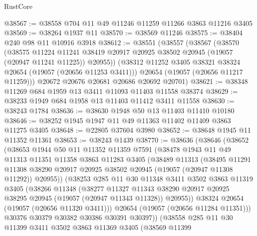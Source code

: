 \begin{lexlean}{RustCore}
\begin{coremodule}
@38567 := @38558 @704 @11 @49 @11246 @11259 @11266 @3863 @11216 @3405
@38569 := @38264 @1937 @11
@38570 := @38569 @11246
@38575 := @38404 @240 @98 @11 @10916 @3918
@38612 := @38551
    (@38557
      (@38567
        (@38570
          (@38575
            @11224
            @11241
            @38419
            @20917
            @20925
            @38502
            @20945
            (@19057 (@20947 @11241 @11225))
            @20955))
        (@38312 @11252 @3405 @38321 @38324 @20654 (@19057 (@20656 @11253 @3411)))
        @20654
        (@19057 (@20656 @11217 @11259)))
      @20672
      @20676
      @20681
      @20686
      @20692
      @20701)
@38621 := @38348 @11269 @684 @1959 @13 @3411 @11093 @11403 @11558 @38374
@38629 := @38233 @1949 @684 @1958 @13 @11403 @11412 @3411 @11558
@38630 := @38243 @1784
@38636 := @38630 @1948 @50 @13 @11403 @11410 @10180
@38646 := @38252 @1945 @1947 @11 @49 @11363 @11402 @11409 @3863 @11275 @3405
@38648 := @22805 @37604 @3980
@38652 := @38648 @1945 @11 @11352 @11361
@38653 := @38243 @1439
@38770 := @38636
    (@38646
      (@38652
        (@38653
          @1944
          @50
          @11
          @11352
          @11359
          @7591
          (@38478
            @1943
            @11
            @49
            @11313
            @11351
            @11358
            @3863
            @11283
            @3405
            (@38489
              @11313
              (@38495
                @11291
                @11308
                @38290
                @20917
                @20925
                @38502
                @20945
                (@19057 (@20947 @11308 @11292))
                @20955))
            (@38253
              @285
              @11
              @30
              @11348
              @3411
              @3502
              @3863
              @11319
              @3405
              (@38266
                @11348
                (@38277
                  @11327
                  @11343
                  @38290
                  @20917
                  @20925
                  @38295
                  @20945
                  (@19057 (@20947 @11343 @11328))
                  @20955))
              @38324
              @20654
              (@19057 (@20656 @11320 @3411)))
            @20654
            (@19057 (@20656 @11284 @11351)))
          @30376
          @30379
          @30382
          @30386
          @30391
          @30397))
      (@38558
        @285
        @11
        @30
        @11399
        @3411
        @3502
        @3863
        @11369
        @3405
        (@38569
          @11399

\end{coremodule}
\end{lexlean}
